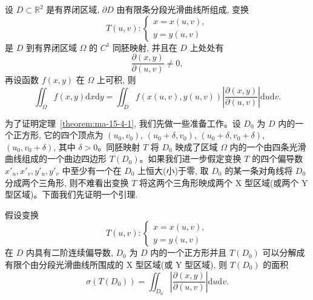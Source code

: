 \begin{theorem}\label{theorem:ma-15-4-1}
设 $D\subset\mathbb R^2$ 是有界闭区域, $\partial D$ 由有限条分段光滑曲线所组成, 变换
\[
  T(u,v):
  \begin{cases}
    x=x(u,v),\\
    y=y(u,v)
  \end{cases}
\]
是 $D$ 到有界闭区域 $\Omega$ 的 $C^1$ 同胚映射, 并且在 $D$ 上处处有
\[
  \frac{\partial(x,y)}{\partial(u,v)}\ne0,
\]
再设函数 $f(x,y)$ 在 $\Omega$ 上可积, 则
\[
  \iint_\Omega f(x,y)\mathrm dx\mathrm dy
  =\iint_D f(x(u,v),y(u,v))
  \left|\frac{\partial(x,y)}{\partial(u,v)}\right|\mathrm du\mathrm dv.
\]
\end{theorem}

为了证明定理~\ref{theorem:ma-15-4-1}, 我们先做一些准备工作。设 $D_0$ 为 $D$ 内的一个正方形, 它的四个顶点为 $(u_0,v_0)$, $(u_0+\delta,v_0)$, $(u_0+\delta,v_0+\delta)$, $(u_0,v_0+\delta)$, 其中 $\delta>0$。同胚映射 $T$ 将 $D_0$ 映成了区域 $\Omega$ 内的一个由四条光滑曲线组成的一个曲边四边形 $T(D_0)$。如果我们进一步假定变换 $T$ 的四个偏导数 $x'_u,x'_v,y'_u,y'_v$ 中至少有一个在 $D_0$ 上恒大(小)于零, 取 $D_0$ 的某一条对角线将 $D_0$ 分成两个三角形, 则不难看出变换 $T$ 将这两个三角形映成两个 X 型区域(或两个 Y 型区域)。下面我们先证明一个引理.

\begin{lemma}\label{lemma:ma-15-4-2}
假设变换
\[
  T(u,v):
  \begin{cases}
    x=x(u,v),\\
    y=y(u,v)
  \end{cases}
\]
在 $D$ 内具有二阶连续偏导数, $D_0$ 为 $D$ 内的一个正方形并且 $T(D_0)$ 可以分解成有限个由分段光滑曲线所围成的 X 型区域(或 Y 型区域), 则 $T(D_0)$ 的面积
\[
  \sigma(T(D_0))=\iint_{D_0}\left|\frac{\partial(x,y)}{\partial(u,v)}\right|\mathrm du\mathrm dv.
\]
\end{lemma}


